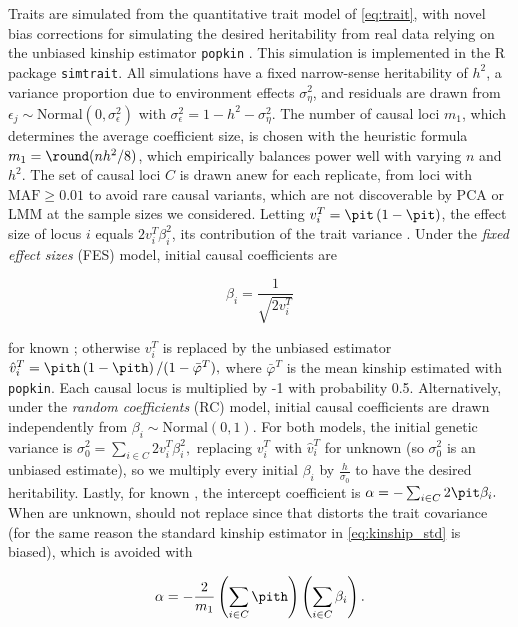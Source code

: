 \documentclass[11pt]{article}
\begin{document}
\begin{linenumbers}
Traits are simulated from the quantitative trait model of \cref{eq:trait}, with novel bias corrections for simulating the desired heritability from real data relying on the unbiased kinship estimator \texttt{popkin} \citep{ochoa_estimating_2021}.
This simulation is implemented in the R package \texttt{simtrait}.
All simulations have a fixed narrow-sense heritability of $h^2$, a variance proportion due to environment effects $\sigma^2_\eta$, and residuals are drawn from $\epsilon_j \sim \text{Normal}(0, \sigma^2_\epsilon )$ with $\sigma^2_\epsilon = 1 - h^2 - \sigma^2_\eta$.
The number of causal loci $m_1$, which determines the average coefficient size, is chosen with the heuristic formula $m_1 = \round( n h^2 / 8 )$, which empirically balances power well with varying $n$ and $h^2$.
The set of causal loci $C$ is drawn anew for each replicate, from loci with $\text{MAF} \ge 0.01$ to avoid rare causal variants, which are not discoverable by PCA or LMM at the sample sizes we considered.
Letting $v_i^T = \pit \left( 1 - \pit \right)$, the effect size of locus $i$ equals $2 v_i^T \beta_i^2$, its contribution of the trait variance \citep{park_estimation_2010}.
Under the \textit{fixed effect sizes} (FES) model, initial causal coefficients are
\begin{linenomath*}
$$
\beta_i = \frac{1}{ \sqrt{ 2 v_i^T } }
$$
\end{linenomath*}
for known \pit; otherwise $v_i^T$ is replaced by the unbiased estimator \citep{ochoa_estimating_2021}
$
\hat{v}_i^T
=
\pith \left( 1 - \pith \right) / ( 1 - \bar{\varphi}^T )
,
$
where $\bar{\varphi}^T$ is the mean kinship estimated with \texttt{popkin}.
Each causal locus is multiplied by -1 with probability 0.5.
Alternatively, under the \textit{random coefficients} (RC) model, initial causal coefficients are drawn independently from $\beta_i \sim \text{Normal}( 0, 1 )$.
For both models, the initial genetic variance is
$
\sigma^2_0
=
\sum_{i \in C} 2 v_i^T \beta_i^2 ,
$
replacing $v_i^T$ with $\hat{v}_i^T$ for unknown \pit (so $\sigma^2_0$ is an unbiased estimate), so we multiply every initial $\beta_i$ by $\frac{h}{ \sigma_0 }$ to have the desired heritability.
Lastly, for known \pit, the intercept coefficient is
$
\alpha = - \sum_{i \in C} 2 \pit \beta_i.
$
When \pit are unknown, \pith should not replace \pit since that distorts the trait covariance (for the same reason the standard kinship estimator in \cref{eq:kinship_std} is biased), which is avoided with
\begin{linenomath*}
$$
\alpha = - \frac{2}{m_1} \left( \sum_{i \in C} \pith \right) \left(\sum_{i \in C} \beta_i \right).
$$
\end{linenomath*}


\end{linenumbers}
\end{document}
